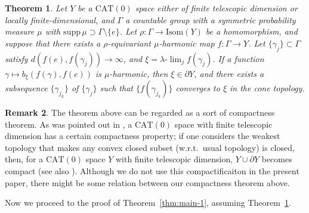 \documentclass[12pt]{amsart}
\numberwithin{equation}{section}
\theoremstyle{plain}
\newtheorem{Theorem}{Theorem}[section]
\theoremstyle{definition}
\newtheorem{Remark}[Theorem]{Remark}
\theoremstyle{remark}
\newcommand{\isom}[1]{\mathrm{Isom}({#1})}
\newcommand{\cat}[1]{\mathrm{CAT}(#1)}
\newcommand{\ulim}{\lambda{\text{-}}\!\lim}
\newcommand{\supp}{\mathrm{supp}\,}
\begin{document}
%
%
\begin{Theorem}
 \label{thm:compactness}
 Let $Y$ be a $\cat{0}$ space either of finite telescopic dimension
 or locally finite-dimensional, and $\Gamma$ a countable
 group with a symmetric probability measure $\mu$ 
 with $\supp\mu\supset \Gamma \setminus \{e\}$. 
 Let $\rho\colon \Gamma \rightarrow \isom{Y}$ be a homomorphism, and
 suppose that there exists a $\rho$-equivariant $\mu$-harmonic map 
 $f\colon \Gamma \rightarrow Y$. 
 Let $\{\gamma_j\}\subset \Gamma$ satisfy
 $d(f(e),f(\gamma_j))\to \infty$, and $\xi=\ulim_j f(\gamma_j)$. 
 If a function $\gamma \mapsto b_{\xi}(f(\gamma),f(e))$ is
 $\mu$-harmonic,  then $\xi \in \partial Y$, and there exists a
 subsequence $\{\gamma_{j_k}\}$ of $\{\gamma_j\}$ such that
 $\{f(\gamma_{j_k})\}$ converges to $\xi$ in the cone topology. 
\end{Theorem}

\begin{Remark}
 The theorem above can be regarded as a sort of compactness theorem. 
 As was pointed out in \cite{bader-duchesne-lecureux}, a $\cat{0}$ space
 with finite telescopic dimension has a certain compactness property; 
 if one considers the weakest topology that makes any convex closed
 subset (w.r.t.~usual topology) is closed, then, for a $\cat{0}$ space
 $Y$ with finite telescopic dimension, $Y \cup \partial Y$ becomes
 compact (see also \cite{monod}). 
 Although we do not use this compactificaiton in the present
 paper, there might be some relation between our compactness theorem
 above. 
\end{Remark}

%
%
Now we proceed to the proof of Theorem~\ref{thm:main-1}, assuming
Theorem~\ref{thm:compactness}.  

\medskip
\end{document}
